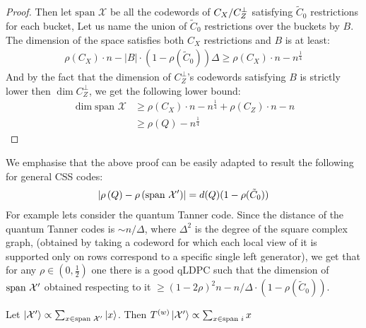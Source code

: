 \documentclass[manuscript,screen,review]{acmart}
\begin{document}
\begin{proof}
  Then let $\text{span }\mathcal{X}$ be all the codewords of $C_{X}/C_{Z}^\perp$ satisfying $\tilde{C}_{0}$ restrictions for each bucket, Let us name the union of $\tilde{C}_{0}$ restrictions over the buckets by $B$. The dimension of the space satisfies both $C_{X}$ restrictions and $B$ is at least:
  \begin{equation*}
    \begin{split}
      \rho(C_{X})\cdot n - |B|\cdot (1 - \rho(\tilde{C}_{0}))\Delta \ge \rho(C_{X})\cdot n - n^{\frac{1}{4}}
    \end{split}
  \end{equation*}
  And by the fact that the dimension of $C_{Z}^\perp$'s codewords satisfying $B$ is strictly lower then $\dim C_{Z}^\perp$, we get the following lower bound:
  \begin{equation*}
    \begin{split}
      \dim \text{span } \mathcal{X} & \ge \rho(C_{X})\cdot n - n^{\frac{1}{4}} + \rho(C_{Z})\cdot n - n \\
     & \ge \rho (Q) - n^{\frac{1}{4}}
    \end{split}
  \end{equation*}
\end{proof}

\begin{remark}
  We emphasise that the above proof can be easily adapted to result the following for general CSS codes: 
\begin{equation*}
    \begin{split}
      \left| \rho\left(Q\right) - \rho\left(\text{span }\mathcal{X}^\prime\right) \right| = d(Q)(1 - \rho(\tilde{C}_{0}))
    \end{split}
  \end{equation*}
  For example lets consider the quantum Tanner code. Since the distance of the quantum Tanner codes is $\sim n/\Delta$, where $\Delta^{2}$ is the degree of the square complex graph, (obtained by taking a codeword for which each local view of it is supported only on rows correspond to a specific single left generator), we get that for any $\rho \in (0,\frac{1}{2})$ one there is a good qLDPC such that the dimension of $\text{span }\mathcal{X}^\prime$ obtained respecting to it $\ge (1-2\rho)^{2}n - n/\Delta \cdot (1 - \rho(\tilde{C}_{0}))$.  
\end{remark}

\begin{claim}
  Let $\ket{\mathcal{X}^\prime} \propto \sum_{x \in \text{span } \mathcal{X}^\prime }{\ket{x}}$. Then $T^{(w)}\ket{\mathcal{X}^\prime} \propto \sum_{x \in \text{span }i}{  x  }$
\end{claim}





%

\printbibliography
\end{document}
